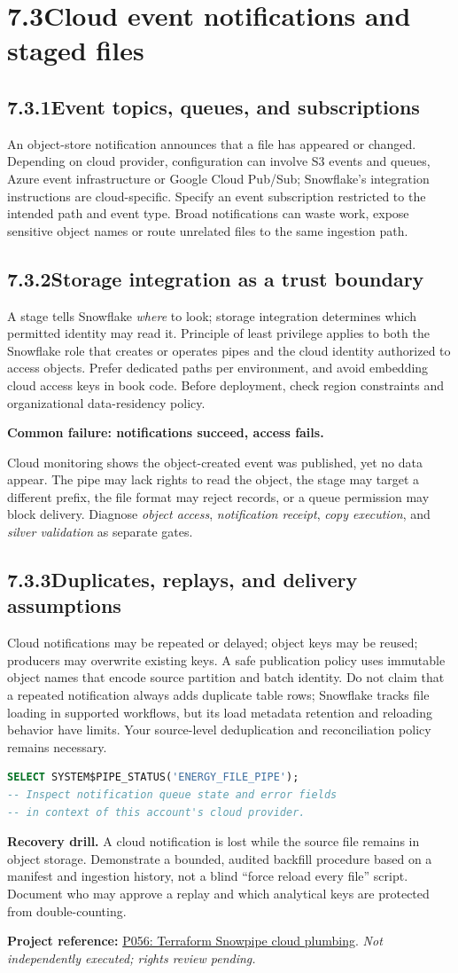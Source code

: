 \documentclass[11pt,twoside]{article}
\newcommand{\topic}[2]{\subsection*{#1\quad #2}}
\newcommand{\repo}[2]{\par\begingroup\fontsize{8.0}{9.6}\selectfont\sffamily\color{inkgray}\textbf{Project reference:} \href{#2}{#1}. \textit{Not independently executed; rights review pending.}\par\endgroup}
\begin{document}
\section*{7.3\quad Cloud event notifications and staged files}
\topic{7.3.1}{Event topics, queues, and subscriptions}
An object-store notification announces that a file has appeared or changed. Depending on cloud provider, configuration can involve S3 events and queues, Azure event infrastructure or Google Cloud Pub/Sub; Snowflake's integration instructions are cloud-specific. Specify an event subscription restricted to the intended path and event type. Broad notifications can waste work, expose sensitive object names or route unrelated files to the same ingestion path.
\topic{7.3.2}{Storage integration as a trust boundary}
A stage tells Snowflake \emph{where} to look; storage integration determines which permitted identity may read it. Principle of least privilege applies to both the Snowflake role that creates or operates pipes and the cloud identity authorized to access objects. Prefer dedicated paths per environment, and avoid embedding cloud access keys in book code. Before deployment, check region constraints and organizational data-residency policy.
\begin{whitebox}\textbf{Common failure: notifications succeed, access fails.}\par
Cloud monitoring shows the object-created event was published, yet no data appear. The pipe may lack rights to read the object, the stage may target a different prefix, the file format may reject records, or a queue permission may block delivery. Diagnose \emph{object access}, \emph{notification receipt}, \emph{copy execution}, and \emph{silver validation} as separate gates.\end{whitebox}
\topic{7.3.3}{Duplicates, replays, and delivery assumptions}
Cloud notifications may be repeated or delayed; object keys may be reused; producers may overwrite existing keys. A safe publication policy uses immutable object names that encode source partition and batch identity. Do not claim that a repeated notification always adds duplicate table rows; Snowflake tracks file loading in supported workflows, but its load metadata retention and reloading behavior have limits. Your source-level deduplication and reconciliation policy remains necessary.
\begin{lstlisting}[language=SQL,caption={Inspect a configured pipe without changing data.}]
SELECT SYSTEM$PIPE_STATUS('ENERGY_FILE_PIPE');
-- Inspect notification queue state and error fields
-- in context of this account's cloud provider.
\end{lstlisting}
\textbf{Recovery drill.} A cloud notification is lost while the source file remains in object storage. Demonstrate a bounded, audited backfill procedure based on a manifest and ingestion history, not a blind ``force reload every file'' script. Document who may approve a replay and which analytical keys are protected from double-counting.
\repo{P056: Terraform Snowpipe cloud plumbing}{https://github.com/Snowflake-Labs/terraform-snowflake-snowpipe-aws}
\newpage
\end{document}
